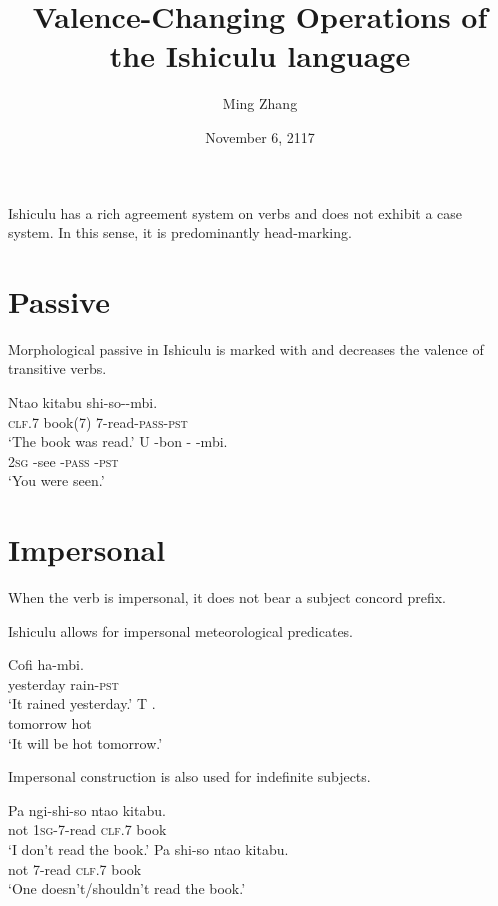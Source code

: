 \documentclass[12pt, oneside]{article}
\title{Valence-Changing Operations of the Ishiculu language}
\author{Ming Zhang}
\date{November 6, 2117}
\let\ipa\textipa
\begin{document}
\maketitle

Ishiculu has a rich agreement system on verbs and does not exhibit a case system. In this sense, it is predominantly head-marking.

\section{Passive}

Morphological passive in Ishiculu is marked with \textit{\ipa{-wal7}} and decreases the valence of transitive verbs.

\begin{exe}
\ex
\gll Nta\textbeltl o kitabu shi-so-\textit{\ipa{wal7}}-mbi. \\
\textsc{clf}.7 book(7) \textsc{7}-read-\textsc{pass}-\textsc{pst}  \\
\trans `The book was read.'
\ex
\gll U -bon -\textit{\ipa{wal7}} -mbi. \\
\textsc{2sg} -see -\textsc{pass} -\textsc{pst}  \\
\trans `You were seen.'
\end{exe}

\section{Impersonal}
When the verb is impersonal, it does not bear a subject concord prefix.

Ishiculu allows for impersonal meteorological predicates.

\begin{exe}
\ex
\gll Cofi ha-mbi. \\
yesterday rain-\textsc{pst} \\
\trans `It rained yesterday.'
\ex
\gll T\ipa{um7} \ipa{r7}. \\
tomorrow hot \\
\trans `It will be hot tomorrow.'
\end{exe}

Impersonal construction is also used for indefinite subjects.

\begin{exe}
\ex
\gll Pa ngi-shi-so nta\textbeltl o kitabu. \\
not \textsc{1sg}-\textsc{7}-read \textsc{clf}.7 book \\
\trans `I don't read the book.'
\ex
\gll Pa shi-so nta\textbeltl o kitabu. \\
not \textsc{7}-read \textsc{clf}.7 book \\
\trans `One doesn't/shouldn't read the book.'
\end{exe}
\end{document}

